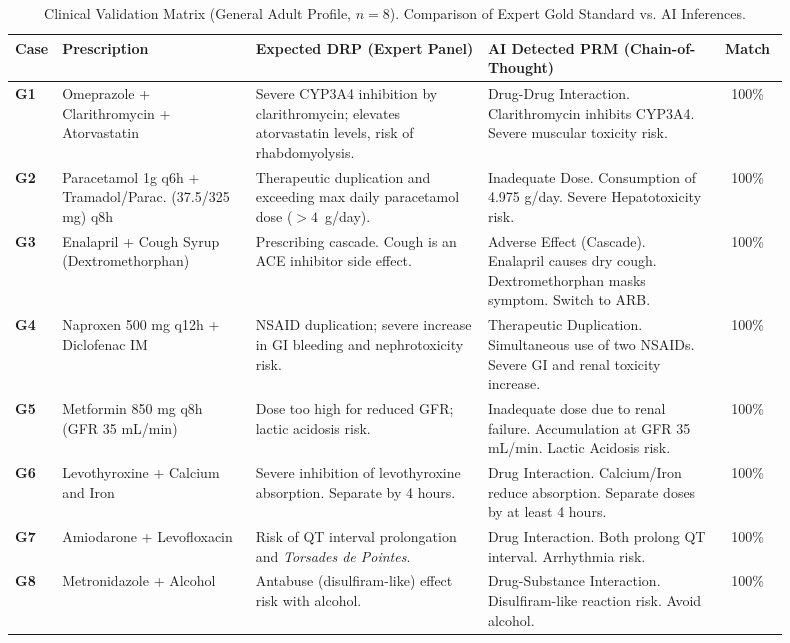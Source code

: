 \documentclass[9pt,conference]{IEEEtran}
\begin{document}
\begin{table}[t]
\centering
\scriptsize
\caption{Clinical Validation Matrix (General Adult Profile, $n=8$). Comparison of Expert Gold Standard vs. AI Inferences.}
\label{tab:correlation_matrix}
\renewcommand{\arraystretch}{1.3}
\begin{tabular}{@{}p{0.05\linewidth}p{0.25\linewidth}p{0.3\linewidth}p{0.3\linewidth}c@{}}
\toprule
\textbf{Case} & \textbf{Prescription} & \textbf{Expected DRP (Expert Panel)} & \textbf{AI Detected PRM (Chain-of-Thought)} & \textbf{Match} \\
\midrule
\textbf{G1} & Omeprazole + Clarithromycin + Atorvastatin & Severe CYP3A4 inhibition by clarithromycin; elevates atorvastatin levels, risk of rhabdomyolysis. & Drug-Drug Interaction. Clarithromycin inhibits CYP3A4. Severe muscular toxicity risk. & 100\% \\
\textbf{G2} & Paracetamol 1g q6h + Tramadol/Parac. (37.5/325 mg) q8h & Therapeutic duplication and exceeding max daily paracetamol dose ($> 4$~g/day). & Inadequate Dose. Consumption of 4.975 g/day. Severe Hepatotoxicity risk. & 100\% \\
\textbf{G3} & Enalapril + Cough Syrup (Dextromethorphan) & Prescribing cascade. Cough is an ACE inhibitor side effect. & Adverse Effect (Cascade). Enalapril causes dry cough. Dextromethorphan masks symptom. Switch to ARB. & 100\% \\
\textbf{G4} & Naproxen 500 mg q12h + Diclofenac IM & NSAID duplication; severe increase in GI bleeding and nephrotoxicity risk. & Therapeutic Duplication. Simultaneous use of two NSAIDs. Severe GI and renal toxicity increase. & 100\% \\
\textbf{G5} & Metformin 850 mg q8h (GFR 35 mL/min) & Dose too high for reduced GFR; lactic acidosis risk. & Inadequate dose due to renal failure. Accumulation at GFR 35 mL/min. Lactic Acidosis risk. & 100\% \\
\textbf{G6} & Levothyroxine + Calcium and Iron & Severe inhibition of levothyroxine absorption. Separate by 4 hours. & Drug Interaction. Calcium/Iron reduce absorption. Separate doses by at least 4 hours. & 100\% \\
\textbf{G7} & Amiodarone + Levofloxacin & Risk of QT interval prolongation and \textit{Torsades de Pointes}. & Drug Interaction. Both prolong QT interval. Arrhythmia risk. & 100\% \\
\textbf{G8} & Metronidazole + Alcohol & Antabuse (disulfiram-like) effect risk with alcohol. & Drug-Substance Interaction. Disulfiram-like reaction risk. Avoid alcohol. & 100\% \\
\bottomrule
\end{tabular}
\end{table}
\end{document}
